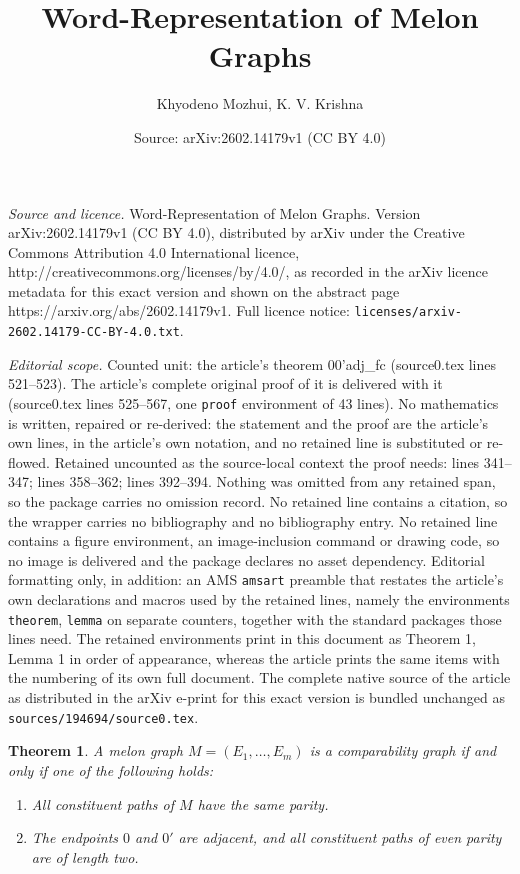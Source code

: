 \documentclass[10pt,a4paper]{amsart}
\title{Word-Representation of Melon Graphs}
\author{Khyodeno Mozhui, K. V. Krishna}
\date{Source: arXiv:2602.14179v1 (CC BY 4.0)}
\newtheorem{theorem}{Theorem}
\begin{document}
\maketitle

\noindent\emph{Source and licence.} Word-Representation of Melon Graphs. Version arXiv:2602.14179v1 (CC BY 4.0), distributed by arXiv under the Creative Commons Attribution 4.0 International licence, http://creativecommons.org/licenses/by/4.0/, as recorded in the arXiv licence metadata for this exact version and shown on the abstract page https://arxiv.org/abs/2602.14179v1. Full licence notice: \texttt{licenses/arxiv-2602.14179-CC-BY-4.0.txt}.\par\smallskip

\noindent\textit{Editorial scope.} Counted unit: the article's theorem 00'adj\_fc (source0.tex lines 521--523). The article's complete original proof of it is delivered with it (source0.tex lines 525--567, one \texttt{proof} environment of 43 lines). No mathematics is written, repaired or re-derived: the statement and the proof are the article's own lines, in the article's own notation, and no retained line is substituted or re-flowed.  Retained uncounted as the source-local context the proof needs: lines 341--347; lines 358--362; lines 392--394.  Nothing was omitted from any retained span, so the package carries no omission record.  No retained line contains a citation, so the wrapper carries no bibliography and no bibliography entry.  No retained line contains a figure environment, an image-inclusion command or drawing code, so no image is delivered and the package declares no asset dependency.  Editorial formatting only, in addition: an AMS \texttt{amsart} preamble that restates the article's own declarations and macros used by the retained lines, namely the environments \texttt{theorem}, \texttt{lemma} on separate counters, together with the standard packages those lines need.  The retained environments print in this document as Theorem 1, Lemma 1 in order of appearance, whereas the article prints the same items with the numbering of its own full document.  The complete native source of the article as distributed in the arXiv e-print for this exact version is bundled unchanged as \texttt{sources/194694/source0.tex}.
\begin{theorem}\label{chr_com_file}
	A melon graph $M = (E_1, \ldots, E_m)$ is a comparability graph if and only if one of the following holds: 
	\begin{enumerate}
		\item All constituent paths of $M$ have the same parity.
		\item The endpoints $0$ and $0'$ are adjacent, and all constituent paths of even parity are of length two. 
	\end{enumerate}	
\end{theorem}
\end{document}
